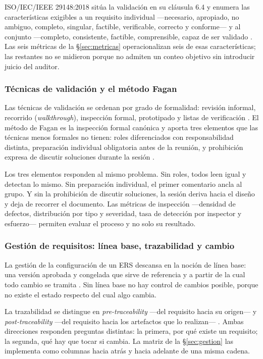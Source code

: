 ISO/IEC/IEEE 29148:2018 sitúa la validación en su cláusula 6.4 y enumera las características
exigibles a un requisito individual ---necesario, apropiado, no ambiguo, completo, singular,
factible, verificable, correcto y conforme--- y al conjunto ---completo, consistente, factible,
comprensible, capaz de ser validado \cite{iso29148}. Las seis métricas de la
\S\ref{sec:metricas} operacionalizan seis de esas características; las restantes no se midieron
porque no admiten un conteo objetivo sin introducir juicio del auditor.

\subsubsection*{Técnicas de validación y el método Fagan}

Las técnicas de validación se ordenan por grado de formalidad: revisión informal, recorrido
(\emph{walkthrough}), inspección formal, prototipado y listas de verificación \cite{pohl2025,
swebok4}. El método de Fagan es la inspección formal canónica y aporta tres elementos que las
técnicas menos formales no tienen: roles diferenciados con responsabilidad distinta, preparación
individual obligatoria antes de la reunión, y prohibición expresa de discutir soluciones durante la
sesión \cite{fagan1976}.

Los tres elementos responden al mismo problema. Sin roles, todos leen igual y detectan lo mismo. Sin
preparación individual, el primer comentario ancla al grupo. Y sin la prohibición de discutir
soluciones, la sesión deriva hacia el diseño y deja de recorrer el documento. Las métricas de
inspección ---densidad de defectos, distribución por tipo y severidad, tasa de detección por
inspector y esfuerzo--- permiten evaluar el proceso y no solo su resultado.

\subsubsection*{Gestión de requisitos: línea base, trazabilidad y cambio}

La gestión de la configuración de un ERS descansa en la noción de línea base: una versión aprobada y
congelada que sirve de referencia y a partir de la cual todo cambio se tramita \cite{swebok4}. Sin
línea base no hay control de cambios posible, porque no existe el estado respecto del cual algo
cambia.

La trazabilidad se distingue en \emph{pre-traceability} ---del requisito hacia su origen--- y
\emph{post-traceability} ---del requisito hacia los artefactos que lo realizan--- \cite{gotel1994}.
Ambas direcciones responden preguntas distintas: la primera, por qué existe un requisito; la segunda,
qué hay que tocar si cambia. La matriz de la \S\ref{sec:gestion} las implementa como columnas hacia
atrás y hacia adelante de una misma cadena.

